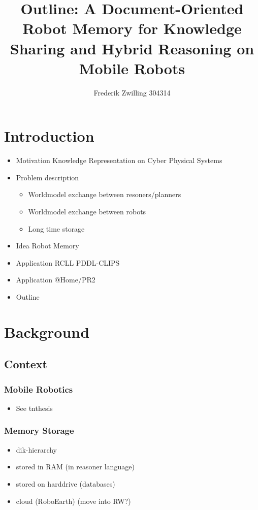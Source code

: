 \documentclass[a4paper,11pt]{article}
\author{Frederik Zwilling 304314}
\title{Outline: A Document-Oriented Robot Memory for Knowledge Sharing and Hybrid Reasoning on Mobile Robots}
\begin{document}
\maketitle
\tableofcontents
\newpage




\section{Introduction}
\begin{itemize}
\item Motivation Knowledge Representation on Cyber Physical Systems
\item Problem description
  \begin{itemize}
  \item Worldmodel exchange between resoners/planners
  \item Worldmodel exchange between robots
  \item Long time storage
  \end{itemize}
\item Idea Robot Memory
\item Application RCLL PDDL-CLIPS
\item Application @Home/PR2
\item Outline
\end{itemize}


\section{Background}

\subsection{Context}
\subsubsection{Mobile Robotics}
\begin{itemize}
\item See tnthesis
\end{itemize}
\subsubsection{Memory Storage}
\begin{itemize}
\item dik-hierarchy
\item stored in RAM (in reasoner language)
\item stored on harddrive (databases)
\item cloud (RoboEarth) (move into RW?)
\end{itemize}
\end{document}
